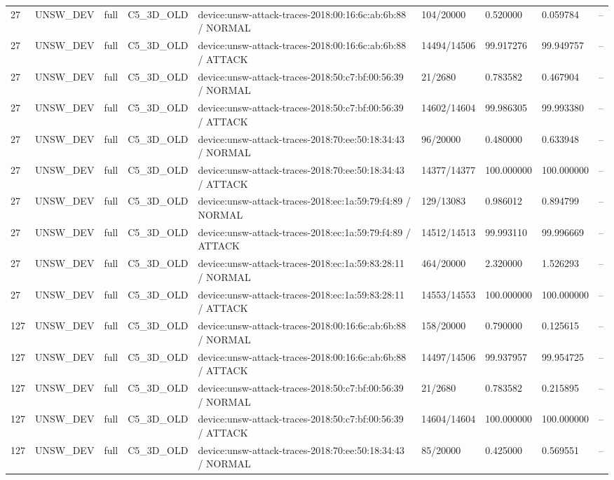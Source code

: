 \begin{tabular}{lllllllll}
27 & UNSW\_DEV & full & C5\_3D\_OLD & device:unsw-attack-traces-2018:00:16:6c:ab:6b:88 / NORMAL & 104/20000 & 0.520000 & 0.059784 & -- \\
27 & UNSW\_DEV & full & C5\_3D\_OLD & device:unsw-attack-traces-2018:00:16:6c:ab:6b:88 / ATTACK & 14494/14506 & 99.917276 & 99.949757 & -- \\
27 & UNSW\_DEV & full & C5\_3D\_OLD & device:unsw-attack-traces-2018:50:c7:bf:00:56:39 / NORMAL & 21/2680 & 0.783582 & 0.467904 & -- \\
27 & UNSW\_DEV & full & C5\_3D\_OLD & device:unsw-attack-traces-2018:50:c7:bf:00:56:39 / ATTACK & 14602/14604 & 99.986305 & 99.993380 & -- \\
27 & UNSW\_DEV & full & C5\_3D\_OLD & device:unsw-attack-traces-2018:70:ee:50:18:34:43 / NORMAL & 96/20000 & 0.480000 & 0.633948 & -- \\
27 & UNSW\_DEV & full & C5\_3D\_OLD & device:unsw-attack-traces-2018:70:ee:50:18:34:43 / ATTACK & 14377/14377 & 100.000000 & 100.000000 & -- \\
27 & UNSW\_DEV & full & C5\_3D\_OLD & device:unsw-attack-traces-2018:ec:1a:59:79:f4:89 / NORMAL & 129/13083 & 0.986012 & 0.894799 & -- \\
27 & UNSW\_DEV & full & C5\_3D\_OLD & device:unsw-attack-traces-2018:ec:1a:59:79:f4:89 / ATTACK & 14512/14513 & 99.993110 & 99.996669 & -- \\
27 & UNSW\_DEV & full & C5\_3D\_OLD & device:unsw-attack-traces-2018:ec:1a:59:83:28:11 / NORMAL & 464/20000 & 2.320000 & 1.526293 & -- \\
27 & UNSW\_DEV & full & C5\_3D\_OLD & device:unsw-attack-traces-2018:ec:1a:59:83:28:11 / ATTACK & 14553/14553 & 100.000000 & 100.000000 & -- \\
127 & UNSW\_DEV & full & C5\_3D\_OLD & device:unsw-attack-traces-2018:00:16:6c:ab:6b:88 / NORMAL & 158/20000 & 0.790000 & 0.125615 & -- \\
127 & UNSW\_DEV & full & C5\_3D\_OLD & device:unsw-attack-traces-2018:00:16:6c:ab:6b:88 / ATTACK & 14497/14506 & 99.937957 & 99.954725 & -- \\
127 & UNSW\_DEV & full & C5\_3D\_OLD & device:unsw-attack-traces-2018:50:c7:bf:00:56:39 / NORMAL & 21/2680 & 0.783582 & 0.215895 & -- \\
127 & UNSW\_DEV & full & C5\_3D\_OLD & device:unsw-attack-traces-2018:50:c7:bf:00:56:39 / ATTACK & 14604/14604 & 100.000000 & 100.000000 & -- \\
127 & UNSW\_DEV & full & C5\_3D\_OLD & device:unsw-attack-traces-2018:70:ee:50:18:34:43 / NORMAL & 85/20000 & 0.425000 & 0.569551 & -- \\

\end{tabular}
